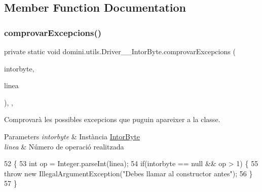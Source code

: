 \subsection{Member Function Documentation}
\mbox{\label{classdomini_1_1utils_1_1Driver____IntorByte_a3cb28e1e1b318e0b8e4809ebd171c8b2}} 
\subsubsection{\texorpdfstring{comprovar\+Excepcions()}{comprovarExcepcions()}}
{\footnotesize\ttfamily private static void domini.\+utils.\+Driver\+\_\+\+\_\+\+Intor\+Byte.\+comprovar\+Excepcions (\begin{DoxyParamCaption}\item[{\hyperlink{classdomini_1_1utils_1_1IntorByte}{Intor\+Byte}}]{intorbyte,  }\item[{String}]{linea }\end{DoxyParamCaption})\hspace{0.3cm}{\ttfamily [inline]}, {\ttfamily [static]}, {\ttfamily [private]}}



Comprovarà les possibles excepcions que puguin apareixer a la classe. 


\begin{DoxyParams}{Parameters}
{\em intorbyte} & Instància \hyperlink{classdomini_1_1utils_1_1IntorByte}{Intor\+Byte} \\
\hline
{\em linea} & Número de operació realitzada \\
\hline
\end{DoxyParams}

\begin{DoxyCode}
52                                                                               \{
53         \textcolor{keywordtype}{int} op = Integer.parseInt(linea);
54         \textcolor{keywordflow}{if}(intorbyte == null && op > 1) \{
55             \textcolor{keywordflow}{throw} \textcolor{keyword}{new} IllegalArgumentException(\textcolor{stringliteral}{"Debes llamar al constructor antes"});
56         \}
57     \}
\end{DoxyCode}
\mbox{\label{classdomini_1_1utils_1_1Driver____IntorByte_a82ac3bdc9baf9f3fa1b8984733d03240}} 

